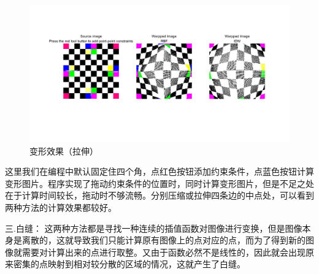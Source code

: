 \documentclass[a4paper]{ltxdoc}
\begin{document}
\begin{figure}[htb]
  \centering
  \includegraphics[width=1.0\textwidth]{fig2.jpg}
  \caption{变形效果（拉伸）}
  \label{fig:fig-1}
\end{figure}

\newpage
这里我们在编程中默认固定住四个角，点红色按钮添加约束条件，点蓝色按钮计算变形图片。程序实现了拖动约束条件的位置时，同时计算变形图片，但是不足之处在于计算时间较长，拖动时不够流畅。分别压缩或拉伸四条边的中点处，可以看到两种方法的计算效果都较好。

三.白缝：
这两种方法都是寻找一种连续的插值函数对图像进行变换，但是图像本身是离散的，这就导致我们只能计算原有图像上的点对应的点，而为了得到新的图像就需要对计算出来的点进行取整。又由于函数必然不是线性的，因此就会出现原来密集的点映射到相对较分散的区域的情况，这就产生了白缝。
\end{document}

